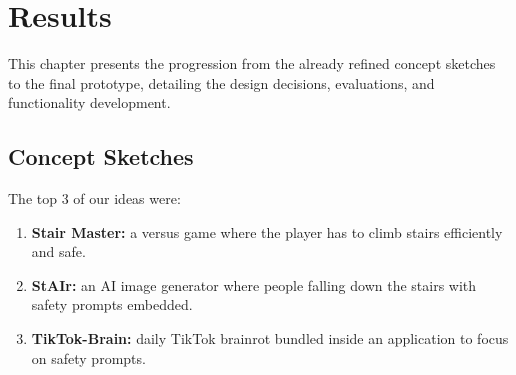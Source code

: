 \documentclass{article}
\begin{document}
\section{Results}
This chapter presents the progression from the already refined concept sketches to the final prototype,
detailing the design decisions, evaluations, and functionality development.

\subsection{Concept Sketches}
The top 3 of our ideas were:

\begin{enumerate}
    \item \textbf{Stair Master:} a versus game where the player has to climb stairs efficiently and safe.
    \item \textbf{StAIr:} an AI image generator where people falling down the stairs with safety prompts embedded.
    \item \textbf{TikTok-Brain:} daily TikTok brainrot bundled inside an application to focus on safety prompts.
\end{enumerate}

\pagebreak
\end{document}
